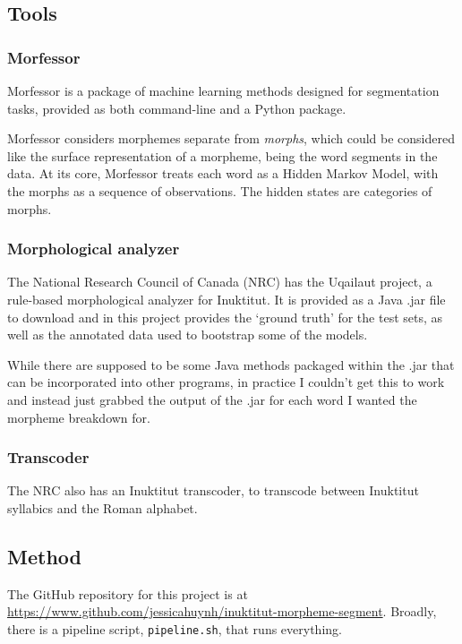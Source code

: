 \documentclass[10pt]{article}
\begin{document}
\subsection{Tools}

\subsubsection{Morfessor}
Morfessor\cite{morfessor} is a package of machine learning methods designed for segmentation tasks, provided as both command-line and a Python package.

Morfessor considers morphemes separate from \emph{morphs}, which could be considered like the surface representation of a morpheme, being the word segments in the data. At its core, Morfessor treats each word as a Hidden Markov Model, with the morphs as a sequence of observations. The hidden states are categories of morphs.\cite{formula}

\subsubsection{Morphological analyzer}
The National Research Council of Canada (NRC) has the Uqailaut project, a rule-based morphological analyzer for Inuktitut.\cite{analyzer} It is provided as a Java .jar file to download and in this project provides the `ground truth' for the test sets, as well as the annotated data used to bootstrap some of the models.

While there are supposed to be some Java methods packaged within the .jar that can be incorporated into other programs, in practice I couldn't get this to work and instead just grabbed the output of the .jar for each word I wanted the morpheme breakdown for.\cite{exec_cmd_java}

\subsubsection{Transcoder}
The NRC also has an Inuktitut transcoder, to transcode between Inuktitut syllabics and the Roman alphabet.\cite{transcoder}

\subsection{Method}
The GitHub repository for this project is at \url{https://www.github.com/jessicahuynh/inuktitut-morpheme-segment}. Broadly, there is a pipeline script, \texttt{pipeline.sh}, that runs everything.
\end{document}
